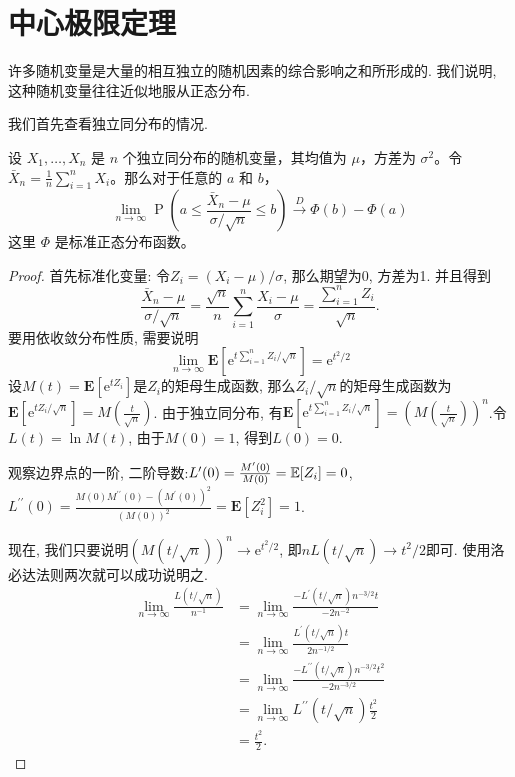 \section{中心极限定理}

许多随机变量是大量的相互独立的随机因素的综合影响之和所形成的. 我们说明, 这种随机变量往往近似地服从正态分布.

我们首先查看独立同分布的情况. 

\begin{theorem}[中心极限定理]
    设 $X_1, \ldots, X_n$ 是 $n$ 个独立同分布的随机变量，其均值为 $\mu$，方差为 $\sigma^2$。令 $\bar{X}_n=\frac{1}{n} \sum_{i=1}^n X_i$。那么对于任意的 $a$ 和 $b$，
    $$
    \lim _{n \rightarrow \infty} \operatorname{P}\left(a \leq \frac{\bar{X}_n-\mu}{\sigma / \sqrt{n}} \leq b\right) \stackrel{D}{\longrightarrow} \Phi(b)-\Phi(a)
    $$
    这里 $\Phi$ 是标准正态分布函数。
        \end{theorem}

    \begin{proof}
        首先标准化变量: 令$Z_i=\left(X_i-\mu\right) / \sigma$, 那么期望为0, 方差为1. 并且得到$$
            \frac{\bar{X}_n-\mu}{\sigma / \sqrt{n}}=\frac{\sqrt{n}}{n} \sum_{i=1}^n \frac{X_i-\mu}{\sigma}=\frac{\sum_{i=1}^n Z_i}{\sqrt{n}} .
            $$
            要用依收敛分布性质, 需要说明$$
            \lim _{n \rightarrow \infty} \mathbf{E}\left[\mathrm{e}^{t \sum_{i=1}^n Z_i / \sqrt{n}}\right]=\mathrm{e}^{t^2 / 2}
            $$
            设$M(t)=\mathbf{E}\left[\mathrm{e}^{t Z_i}\right]$是$Z_i$的矩母生成函数, 那么$Z_i / \sqrt{n}$的矩母生成函数为$\mathbf{E}\left[\mathrm{e}^{t Z_i / \sqrt{n}}\right]=M\left(\frac{t}{\sqrt{n}}\right)$. 由于独立同分布, 有$\mathbf{E}\left[\mathrm{e}^{t \sum_{i=1}^n Z_i / \sqrt{n}}\right]=\left(M\left(\frac{t}{\sqrt{n}}\right)\right)^n$.令$L(t)=\ln M(t)$, 由于$M(0)=1$, 得到$L(0)=0$.

            观察边界点的一阶, 二阶导数:$L^{\prime}(0)=\frac{M^{\prime}(0)}{M(0)}=\mathbb E[Z_i]=0$, $L^{\prime \prime}(0)=\frac{M(0) M^{\prime \prime}(0)-\left(M^{\prime}(0)\right)^2}{(M(0))^2}=\mathbf{E}\left[Z_i^2\right]=1$.

            现在, 我们只要说明$(M(t / \sqrt{n}))^n \rightarrow \mathrm{e}^{t^2 / 2}$, 即$n L(t / \sqrt{n}) \rightarrow t^2 / 2$即可. 
            使用洛必达法则两次就可以成功说明之.
        $$\begin{aligned} \lim _{n \rightarrow \infty} \frac{L(t / \sqrt{n})}{n^{-1}} & =\lim _{n \rightarrow \infty} \frac{-L^{\prime}(t / \sqrt{n}) n^{-3 / 2} t}{-2 n^{-2}} \\ & =\lim _{n \rightarrow \infty} \frac{L^{\prime}(t / \sqrt{n}) t}{2 n^{-1 / 2}} \\ & =\lim _{n \rightarrow \infty} \frac{-L^{\prime \prime}(t / \sqrt{n}) n^{-3 / 2} t^2}{-2 n^{-3 / 2}} \\ & =\lim _{n \rightarrow \infty} L^{\prime \prime}(t / \sqrt{n}) \frac{t^2}{2} \\ & =\frac{t^2}{2} .\end{aligned}$$

    \end{proof}





